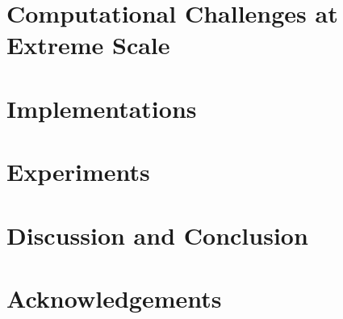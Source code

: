 \documentclass[conference]{IEEEtran}
\begin{document}
\section{Computational Challenges at Extreme Scale}\label{sec:3}



\section{Implementations}\label{sec:4}





\section{Experiments}\label{sec:6}



\section{Discussion and Conclusion}\label{sec:conclusion}



\section*{Acknowledgements}





\end{document}
